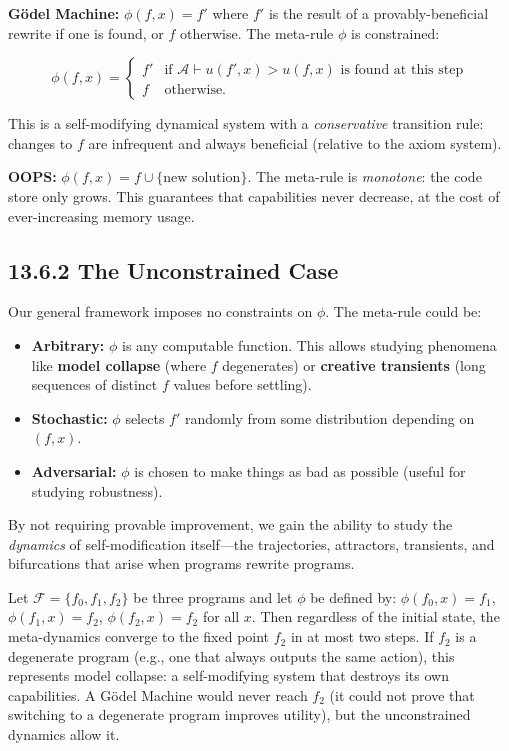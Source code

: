 \textbf{Gödel Machine:} $\phi(f, x) = f'$ where $f'$ is the result of a provably-beneficial rewrite if one is found, or $f$ otherwise. The meta-rule $\phi$ is constrained:

\[
\phi(f, x) = \begin{cases} f' & \text{if } \mathcal{A} \vdash u(f', x) > u(f, x) \text{ is found at this step} \\ f & \text{otherwise.} \end{cases}
\]

This is a self-modifying dynamical system with a \textit{conservative} transition rule: changes to $f$ are infrequent and always beneficial (relative to the axiom system).

\textbf{OOPS:} $\phi(f, x) = f \cup \{ \text{new solution}\} $. The meta-rule is \textit{monotone}: the code store only grows. This guarantees that capabilities never decrease, at the cost of ever-increasing memory usage.

\subsection{13.6.2 The Unconstrained Case}

Our general framework imposes no constraints on $\phi$. The meta-rule could be:

\begin{itemize}
  \item \textbf{Arbitrary:} $\phi$ is any computable function. This allows studying phenomena like \textbf{model collapse} (where $f$ degenerates) or \textbf{creative transients} (long sequences of distinct $f$ values before settling).
  \item \textbf{Stochastic:} $\phi$ selects $f'$ randomly from some distribution depending on $(f, x)$.
  \item \textbf{Adversarial:} $\phi$ is chosen to make things as bad as possible (useful for studying robustness).
\end{itemize}

By not requiring provable improvement, we gain the ability to study the \textit{dynamics} of self-modification itself---the trajectories, attractors, transients, and bifurcations that arise when programs rewrite programs.

\begin{example}
Let $\mathcal{F} = \{ f_0, f_1, f_2\} $ be three programs and let $\phi$ be defined by: $\phi(f_0, x) = f_1$, $\phi(f_1, x) = f_2$, $\phi(f_2, x) = f_2$ for all $x$. Then regardless of the initial state, the meta-dynamics converge to the fixed point $f_2$ in at most two steps. If $f_2$ is a degenerate program (e.g., one that always outputs the same action), this represents model collapse: a self-modifying system that destroys its own capabilities. A Gödel Machine would never reach $f_2$ (it could not prove that switching to a degenerate program improves utility), but the unconstrained dynamics allow it.
\end{example}

